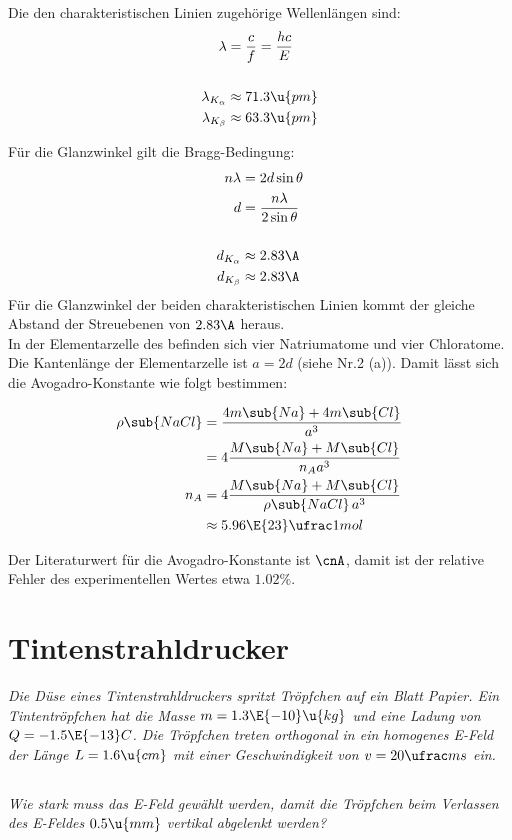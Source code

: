 \documentclass[ex,minted,hatbasis]{exercise_4.0}
\begin{document}
Die den charakteristischen Linien zugehörige Wellenlängen sind:
\begin{align*}
    \lambda &= \frac cf = \frac{hc}{E}\\
    \\
    \lambda_{K_\alpha} &\approx 71.3\u{pm}\\
    \lambda_{K_\beta} &\approx 63.3\u{pm}
\end{align*}

Für die Glanzwinkel gilt die Bragg-Bedingung:
\begin{align*}
    n\lambda &= 2d \sin\theta\\
    d &= \frac{n\lambda}{2\sin\theta}\\
    \\
    d_{K_\alpha} &\approx 2.83\A\\
    d_{K_\beta} &\approx 2.83\A
\end{align*}
Für die Glanzwinkel der beiden charakteristischen Linien kommt der gleiche Abstand der Streuebenen von $2.83\A$ heraus. \\

In der Elementarzelle des  befinden sich vier Natriumatome und vier Chloratome. Die Kantenlänge der Elementarzelle ist $a=2d$ (siehe Nr.2 (a)). Damit lässt sich die Avogadro-Konstante wie folgt bestimmen:

\begin{align*}
    \rho\sub{NaCl} &= \frac{4m\sub{Na} + 4m\sub{Cl}}{a^3} \\
    &= 4\frac{M\sub{Na} + M\sub{Cl}}{n_A a^3} \\
    n_A &= 4\frac{M\sub{Na} + M\sub{Cl}}{\rho\sub{NaCl} \,a^3} \\
    &\approx 5.96\E{23} \ufrac1{mol}
\end{align*}

Der Literaturwert für die Avogadro-Konstante ist $\cnA$, damit ist der relative Fehler des experimentellen Wertes etwa \(1.02\%\).

\section{Tintenstrahldrucker}
{\it Die Düse eines Tintenstrahldruckers spritzt Tröpfchen auf ein Blatt Papier. Ein Tintentröpfchen hat die Masse $m = 1.3\E{-10}\u{kg}$ und eine Ladung von $Q = -1.5 \E{-13} C$. Die Tröpfchen treten orthogonal in ein homogenes E-Feld der Länge $L = 1.6 \u{cm}$ mit einer Geschwindigkeit von $v = 20 \ufrac ms$ ein.}

\subsection{}
{\it Wie stark muss das E-Feld gewählt werden, damit die Tröpfchen beim Verlassen des E-Feldes $0.5 \u{mm}$ vertikal abgelenkt werden?}\vspace{2ex}
\end{document}
